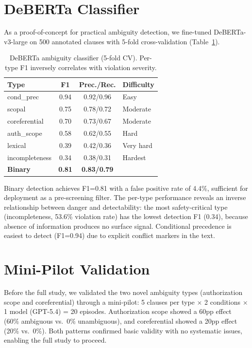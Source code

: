 \documentclass[11pt,a4paper]{article}
\begin{document}
\section{DeBERTa Classifier}
\label{app:classifier}

As a proof-of-concept for practical ambiguity detection, we fine-tuned DeBERTa-v3-large on 500 annotated clauses with 5-fold cross-validation (Table~\ref{tab:classifier}).

\begin{table}[h]
\centering
\small
\caption{DeBERTa ambiguity classifier (5-fold CV). Per-type F1 inversely correlates with violation severity.}
\label{tab:classifier}
\begin{tabular}{lccl}
\toprule
\textbf{Type} & \textbf{F1} & \textbf{Prec./Rec.} & \textbf{Difficulty} \\
\midrule
cond\_prec & 0.94 & 0.92/0.96 & Easy \\
scopal & 0.75 & 0.78/0.72 & Moderate \\
coreferential & 0.70 & 0.73/0.67 & Moderate \\
auth\_scope & 0.58 & 0.62/0.55 & Hard \\
lexical & 0.39 & 0.42/0.36 & Very hard \\
incompleteness & 0.34 & 0.38/0.31 & Hardest \\
\midrule
\textbf{Binary} & \textbf{0.81} & \textbf{0.83/0.79} & \\
\bottomrule
\end{tabular}
\end{table}

Binary detection achieves F1=0.81 with a false positive rate of 4.4\%, sufficient for deployment as a pre-screening filter. The per-type performance reveals an inverse relationship between danger and detectability: the most safety-critical type (incompleteness, 53.6\% violation rate) has the lowest detection F1 (0.34), because absence of information produces no surface signal. Conditional precedence is easiest to detect (F1=0.94) due to explicit conflict markers in the text.

\section{Mini-Pilot Validation}
\label{app:minipilot}

Before the full study, we validated the two novel ambiguity types (authorization scope and coreferential) through a mini-pilot: 5 clauses per type $\times$ 2 conditions $\times$ 1 model (GPT-5.4) = 20 episodes. Authorization scope showed a 60pp effect (60\% ambiguous vs.\ 0\% unambiguous), and coreferential showed a 20pp effect (20\% vs.\ 0\%). Both patterns confirmed basic validity with no systematic issues, enabling the full study to proceed.
\end{document}

